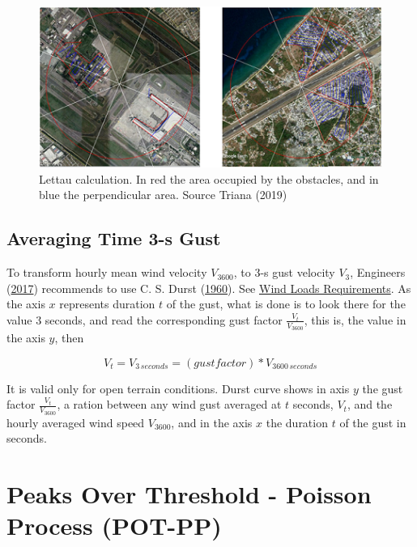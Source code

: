 \documentclass[12pt,oneside]{reedthesis}
\begin{document}
\footnotesize
\begin{figure}

{\centering \includegraphics[width=6.18in]{figure/lettauvalues} 

}

\caption{Lettau calculation. In red the area occupied by the obstacles, and in blue the perpendicular area. Source Triana (2019)}\label{fig:lettauvalues}
\end{figure}
\normalsize

\hypertarget{rmd-gust}{%
\subsection{Averaging Time 3-s Gust}\label{rmd-gust}}

To transform hourly mean wind velocity \(V_{3600}\), to 3-s gust velocity \(V_3\), Engineers (\protect\hyperlink{ref-Asce2017}{2017}) recommends to use C. S. Durst (\protect\hyperlink{ref-Durst1960}{1960}). See \protect\hyperlink{windloadsrequirements}{Wind Loads Requirements}. As the axis \(x\) represents duration \(t\) of the gust, what is done is to look there for the value 3 seconds, and read the corresponding gust factor \(\frac{V_t}{V_{3600}}\), this is, the value in the axis \(y\), then

\[
V_t = V_{3\,seconds} = (gust factor) * V_{3600\,seconds}
\]

It is valid only for open terrain conditions. Durst curve shows in axis \(y\) the gust factor \(\frac{V_t}{V_{3600}}\), a ration between any wind gust averaged at \(t\) seconds, \(V_t\), and the hourly averaged wind speed \(V_{3600}\), and in the axis \(x\) the duration \(t\) of the gust in seconds.

\hypertarget{peaks-over-threshold---poisson-process-pot-pp}{%
\section{Peaks Over Threshold - Poisson Process (POT-PP)}\label{peaks-over-threshold---poisson-process-pot-pp}}
\end{document}
